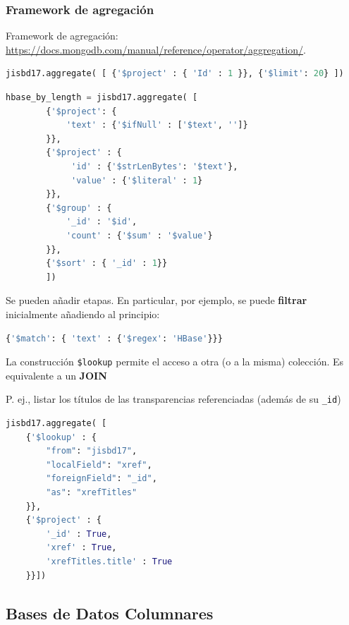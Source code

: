 \documentclass[14pt]{beamer}
\begin{document}
\begin{frame}
  \frametitle{Framework de agregación}
Framework de agregación:
\url{https://docs.mongodb.com/manual/reference/operator/aggregation/}.

\begin{lstlisting}[language=python]
jisbd17.aggregate( [ {'$project' : { 'Id' : 1 }}, {'$limit': 20} ])
\end{lstlisting}

\framebreak

\begin{lstlisting}[language=python]
hbase_by_length = jisbd17.aggregate( [
        {'$project': {
            'text' : {'$ifNull' : ['$text', '']}
        }},
        {'$project' : {
             'id' : {'$strLenBytes': '$text'},
             'value' : {'$literal' : 1}
        }},
        {'$group' : {
            '_id' : '$id',
            'count' : {'$sum' : '$value'}
        }},
        {'$sort' : { '_id' : 1}}
        ])
\end{lstlisting}

\framebreak

Se pueden añadir etapas. En particular, por ejemplo, se puede {\bf filtrar}
inicialmente añadiendo al principio:

\begin{lstlisting}[language=python]
{'$match': { 'text' : {'$regex': 'HBase'}}}
\end{lstlisting}

La construcción
\verb|$lookup| permite el acceso a otra (o a la misma) colección. Es
equivalente a un {\bf JOIN}

\begin{block}{}
  P. ej., listar los títulos de las transparencias referenciadas
  (además de su {\tt \_id})

\begin{lstlisting}[language=python]
jisbd17.aggregate( [
    {'$lookup' : {
        "from": "jisbd17",
        "localField": "xref",
        "foreignField": "_id",
        "as": "xrefTitles"
    }},
    {'$project' : {
        '_id' : True,
        'xref' : True,
        'xrefTitles.title' : True
    }}])
\end{lstlisting}
\end{block}

\end{frame}

\subsection{Bases de Datos Columnares}
\end{document}
